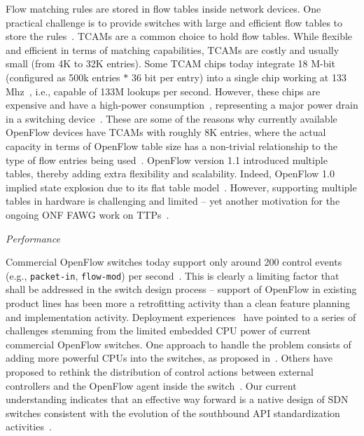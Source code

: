 Flow matching rules are stored in flow tables inside network devices.
One practical challenge is to provide switches with large and efficient flow tables to store the 
rules~\cite{appelman2012}. TCAMs are a common choice to hold flow tables. While flexible 
and efficient in terms of matching capabilities, TCAMs are costly and usually small (from 4K to 32K 
entries). Some TCAM chips today integrate 18 M-bit (configured as 500k entries $*$ 36 bit per entry) 
into a single chip working at 133 Mhz~\cite{kannan2013}, i.e., capable of 133M lookups 
per second. However, these chips are expensive and have a high-power consumption~\cite{liao2012}, 
representing a major power drain in a switching device~\cite{agrawal2006}. These are some of the reasons 
why currently available OpenFlow devices have TCAMs with roughly 8K entries, where the actual capacity 
in terms of OpenFlow table size has a non-trivial relationship to the type of flow entries being used~\cite{owens2013,salisbury2012}. OpenFlow version 1.1 introduced multiple tables, 
thereby adding extra flexibility and scalability. Indeed, OpenFlow 1.0 implied state explosion due to 
its flat table model~\cite{onf2013}. However, supporting multiple tables in hardware is challenging 
and limited -- yet another motivation for the ongoing ONF FAWG work on TTPs~\cite{onf2013}.

\vspace{2mm}
\noindent \textit{Performance}

 Commercial OpenFlow switches today support only around 200 control events (e.g., 
\texttt{packet-in}, \texttt{flow-mod}) per second~\cite{stephens2012-1}. This is clearly a limiting 
factor that shall be addressed in the switch design process -- support of OpenFlow in existing product 
lines has been more a retrofitting activity than a clean feature planning and implementation activity. Deployment experiences~\cite{Kobayashi2014151} have pointed to a series of challenges stemming from the limited embedded CPU power of current commercial OpenFlow switches. 
One approach to handle the problem consists of adding more powerful CPUs into the switches, as proposed 
in~\cite{mogul2012}. Others have proposed to rethink the distribution of control 
actions between external controllers and the OpenFlow agent inside the switch~\cite{curtis2011}. 
Our current understanding indicates that an effective way forward is a native design of SDN switches 
consistent with the evolution of the southbound API standardization activities~\cite{bosshart2013-1,onf2013}. 

